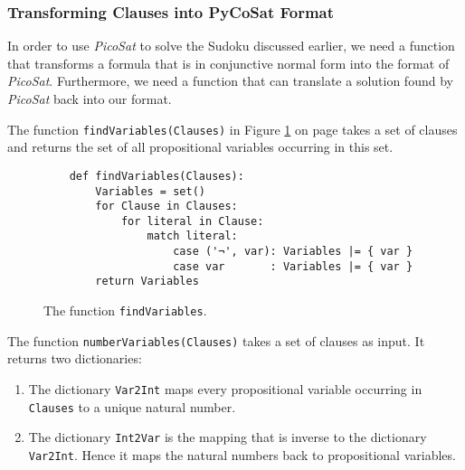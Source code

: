 \subsubsection{Transforming Clauses into PyCoSat Format}
In order to use \textsl{PicoSat} to solve the Sudoku discussed earlier, we need a function that transforms a
formula that is in conjunctive normal form into the format of \textsl{PicoSat}.  Furthermore, we need  a function that can translate a solution found by \textsl{PicoSat} back into our format.

The function \texttt{findVariables(Clauses)} in Figure \ref{fig:sudoku-findVariables} on page
\pageref{fig:sudoku-findVariables} takes a set of clauses and returns the set of all propositional variables
occurring in this set.
\pagebreak

\begin{figure}[!ht]
\centering
\begin{verbatim}
    def findVariables(Clauses):
        Variables = set()
        for Clause in Clauses:
            for literal in Clause:
                match literal:
                    case ('¬', var): Variables |= { var }
                    case var       : Variables |= { var }
        return Variables
\end{verbatim}
\vspace*{-0.3cm}
\caption{The function \texttt{findVariables}.}
\label{fig:sudoku-findVariables}
\end{figure}

The function \texttt{numberVariables(Clauses)} takes a set of clauses as input.  It returns two dictionaries:
\begin{enumerate}
\item The dictionary \texttt{Var2Int} maps every propositional variable occurring in \texttt{Clauses} to a
      unique natural number. 
\item The dictionary \texttt{Int2Var} is the mapping that is inverse to the dictionary \texttt{Var2Int}.
      Hence it maps the natural numbers back to propositional variables.
\end{enumerate}

